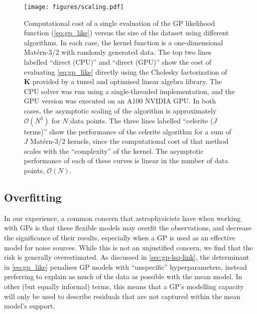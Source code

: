 \documentclass[letterpaper]{ar-1col}
\newcommand{\project}[1]{\textsf{#1}}
\begin{document}
\begin{figure}[ht]
  \centering
  \texttt{[image: figures/scaling.pdf]}
  \caption{Computational cost of a single evaluation of the GP likelihood function (\autoref{eq:gp_like}) versus the size of the dataset using different algorithms.
  In each case, the kernel function is a one-dimensional Mat\'ern-3/2 with randomly generated data.
  The top two lines labelled ``direct (CPU)'' and ``direct (GPU)'' show the cost of evaluating \autoref{eq:gp_like} directly using the Cholesky factorization of $\mathbf{K}$ provided by a tuned and optimised linear algebra library.
  The CPU solver was run using a single-threaded implementation, and the GPU version was executed on an \textsf{A100 NVIDIA} GPU.
  In both cases, the asymptotic scaling of the algorithm is approximately $\mathcal{O}(N^3)$ for $N$ data points.
  The three lines labelled ``celerite ($J$ terms)'' show the performance of the \project{celerite} algorithm \citep[][as implemented by the \project{tinygp} package]{celerite} for a sum of $J$ Mat\'ern-3/2 kernels, since the computational cost of that method scales with the ``complexity'' of the kernel.
  The asymptotic performance of each of these curves is linear in the number of data points, $\mathcal{O}(N)$.}
  \label{fig:scaling}
\end{figure}


\subsection{Overfitting}

In our experience, a common concern that astrophysicists have when working with GPs is that these flexible models may overfit the observations, and decrease the significance of their results, especially when a GP is used as an effective model for noise sources.
While this is not an unjustified concern, we find that the risk is generally overestimated.
As discussed in \autoref{sec:gp-lsq-link}, the determinant in \autoref{eq:gp_like} penalises GP models with ``unspecific'' hyperparameters, instead preferring to explain as much of the data as possible with the mean model.
In other (but equally informal) terms, this means that a GP's modelling capacity will only be used to describe residuals that are not captured within the mean model's support.
\end{document}
